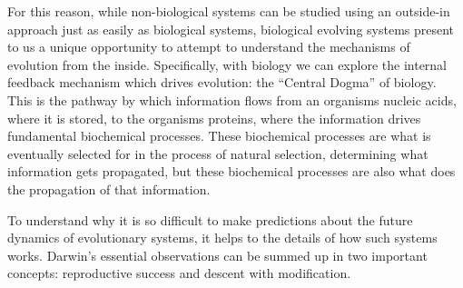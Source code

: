 For this reason, while non-biological systems can be studied using an outside-in approach just as easily as biological systems, biological evolving systems present to us a unique opportunity to attempt to understand the mechanisms of evolution from the inside. Specifically, with biology we can explore the internal feedback mechanism which drives evolution: the ``Central Dogma'' of biology. This is the pathway by which information flows from an organisms nucleic acids, where it is stored, to the organisms proteins, where the information drives fundamental biochemical processes. These biochemical processes are what is eventually selected for in the process of natural selection, determining what information gets propagated, but these biochemical processes are also what does the propagation of that information.

To understand why it is so difficult to make predictions about the future dynamics of evolutionary systems, it helps to the details of how such systems works. Darwin's essential observations can be summed up in two important concepts: reproductive success and descent with modification.
